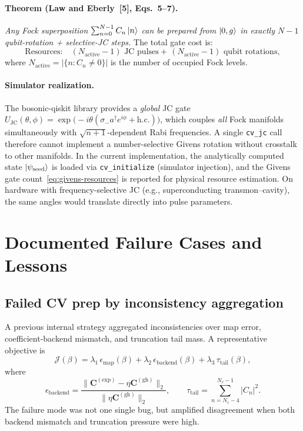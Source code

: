 \documentclass[11pt]{article}
\begin{document}
\paragraph{Theorem (Law and Eberly~[5], Eqs.~5--7).}
\emph{Any Fock superposition $\sum_{n=0}^{N-1}C_n\ket{n}$ can be prepared
from $\ket{0,g}$ in exactly $N-1$ qubit-rotation + selective-JC steps.}
The total gate cost is:
\begin{equation}
\text{Resources:}\quad
(N_{\mathrm{active}}-1)\text{ JC pulses}
+\,(N_{\mathrm{active}}-1)\text{ qubit rotations},
\label{eq:givens-resources}
\end{equation}
where $N_{\mathrm{active}}=|\{n:C_n\ne 0\}|$ is the number of occupied Fock levels.

\paragraph{Simulator realization.}
The bosonic-qiskit library provides a \emph{global} JC gate
$U_{\mathrm{JC}}(\theta,\phi)=\exp\bigl(-i\theta(\sigma_- a^\dagger e^{i\phi}+\mathrm{h.c.})\bigr)$,
which couples \emph{all} Fock manifolds simultaneously with
$\sqrt{n+1}$-dependent Rabi frequencies.
A single \texttt{cv\_jc} call therefore cannot implement a
number-selective Givens rotation without crosstalk to other manifolds.
In the current implementation,
the analytically computed state $\ket{\psi_{\mathrm{seed}}}$ is loaded
via \texttt{cv\_initialize} (simulator injection), and the Givens gate
count~\eqref{eq:givens-resources} is reported for physical resource estimation.
On hardware with frequency-selective JC (e.g., superconducting transmon--cavity),
the same angles would translate directly into pulse parameters.

\section{Documented Failure Cases and Lessons}
\subsection{Failed CV prep by inconsistency aggregation}
A previous internal strategy aggregated inconsistencies over map error, coefficient-backend mismatch, and truncation tail mass. A representative objective is
\begin{equation}
\mathcal{J}(\beta)=
\lambda_1\,\epsilon_{\mathrm{map}}(\beta)
+\lambda_2\,\epsilon_{\mathrm{backend}}(\beta)
+\lambda_3\,\tau_{\mathrm{tail}}(\beta),
\end{equation}
where
\begin{equation}
\epsilon_{\mathrm{backend}}=
\frac{\|\bm{C}^{(\mathrm{exp})}-\eta\bm{C}^{(\mathrm{gh})}\|_2}{\|\eta\bm{C}^{(\mathrm{gh})}\|_2},
\qquad
\tau_{\mathrm{tail}}=\sum_{n=N_c-4}^{N_c-1}|C_n|^2.
\end{equation}
The failure mode was not one single bug, but amplified disagreement when both backend mismatch and truncation pressure were high.
\end{document}
